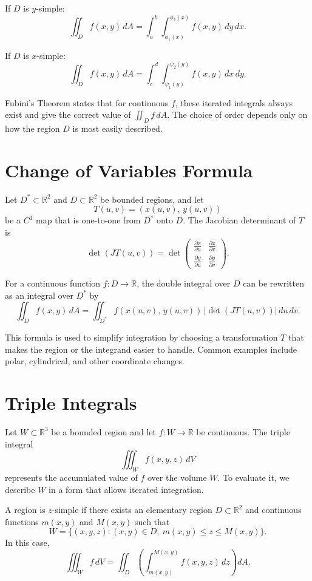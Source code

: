 \documentclass{article}
\begin{document}
If \(D\) is \(y\)-simple:
\[
\iint_D f(x,y)\, dA
= \int_a^b \int_{\phi_1(x)}^{\phi_2(x)} f(x,y)\, dy\, dx.
\]

If \(D\) is \(x\)-simple:
\[
\iint_D f(x,y)\, dA
= \int_c^d \int_{\psi_1(y)}^{\psi_2(y)} f(x,y)\, dx\, dy.
\]

Fubini's Theorem states that for continuous \(f\), these iterated integrals always exist and give the correct value of \(\iint_D f\, dA\). The choice of order depends only on how the region \(D\) is most easily described.

\section{Change of Variables Formula}
Let \(D^* \subset \mathbb{R}^2\) and \(D \subset \mathbb{R}^2\) be bounded regions, and let  
\[
T(u,v) = (x(u,v),\, y(u,v))
\]
be a \(C^1\) map that is one-to-one from \(D^*\) onto \(D\).  
The Jacobian determinant of \(T\) is
\[
\det(JT(u,v)) 
= \det 
\begin{pmatrix}
\frac{\partial x}{\partial u} & \frac{\partial x}{\partial v} \\
\frac{\partial y}{\partial u} & \frac{\partial y}{\partial v}
\end{pmatrix}.
\]

For a continuous function \(f : D \to \mathbb{R}\), the double integral over \(D\) can be rewritten as an integral over \(D^*\) by
\[
\iint_D f(x,y)\, dA
=
\iint_{D^*} f(x(u,v),\, y(u,v))\, 
\left| \det(JT(u,v)) \right|\, du\, dv.
\]

This formula is used to simplify integration by choosing a transformation \(T\) that makes the region or the integrand easier to handle.  Common examples include polar, cylindrical, and other coordinate changes.

\section{Triple Integrals}

Let \(W \subset \mathbb{R}^3\) be a bounded region and let \(f : W \to \mathbb{R}\) be continuous.  
The triple integral
\[
\iiint_W f(x,y,z)\, dV
\]
represents the accumulated value of \(f\) over the volume \(W\).  
To evaluate it, we describe \(W\) in a form that allows iterated integration.

A region is \(z\)-simple if there exists an elementary region \(D \subset \mathbb{R}^2\) and continuous functions \(m(x,y)\) and \(M(x,y)\) such that
\[
W = \{(x,y,z) : (x,y)\in D,\ m(x,y) \le z \le M(x,y) \}.
\]
In this case,
\[
\iiint_W f\, dV
= \iint_D \left( \int_{m(x,y)}^{M(x,y)} f(x,y,z)\, dz \right) dA.
\]
\end{document}
